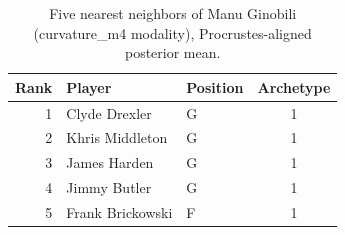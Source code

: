 \begin{table}[htbp]
  \centering\small
  \begin{tabular}{rllc}
    \toprule
    Rank & Player & Position & Archetype \\
    \midrule
    1 & Clyde Drexler & G & 1 \\
    2 & Khris Middleton & G & 1 \\
    3 & James Harden & G & 1 \\
    4 & Jimmy Butler & G & 1 \\
    5 & Frank Brickowski & F & 1 \\
    \bottomrule
  \end{tabular}
  \caption{Five nearest neighbors of Manu Ginobili (curvature_m4 modality), Procrustes-aligned posterior mean.}
  \label{tab:Manu_Ginobili_neighbors_curvature_m4}
\end{table}

